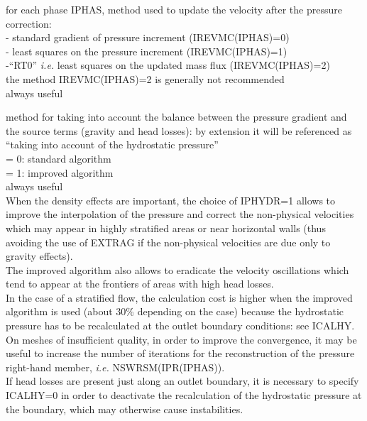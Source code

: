 {for each phase IPHAS, method used to update the velocity after the pressure
correction:\\
\hspace*{0,5cm}- standard gradient of pressure increment
(IREVMC(IPHAS)=0)\\
\hspace*{0,5cm}- least squares on the pressure increment
(IREVMC(IPHAS)=1)\\
\hspace*{0,5cm}-``RT0'' {\em i.e.} least squares on the updated mass flux
(IREVMC(IPHAS)=2)\\
the method IREVMC(IPHAS)=2 is generally not recommended\\
always useful}

{method for taking into account the balance between the pressure gradient and
the source terms (gravity and head losses): by extension it will be
referenced as ``taking into account of the hydrostatic pressure''\\
\hspace*{1.3cm}= 0: standard algorithm\\
\hspace*{1.3cm}= 1: improved algorithm\\
always useful\\
When the density effects are important, the choice of
IPHYDR=1 allows to improve the interpolation of the pressure and correct the
non-physical velocities which may appear in highly
stratified areas or near horizontal walls (thus
avoiding the use of EXTRAG if the non-physical velocities are due only to
gravity effects).\\
The improved algorithm also allows to eradicate the velocity oscillations
which tend to appear at the frontiers of areas with high head losses.\\
In the case of a stratified flow, the calculation cost is higher when the
improved algorithm is used (about 30\% depending on the case) because
the hydrostatic pressure has to be recalculated at the outlet boundary
conditions: see ICALHY.\\
On meshes of insufficient quality, in order to
improve the convergence, it may be useful to increase the number of
iterations for the reconstruction of the pressure right-hand member,
{\em i.e.} \mbox{NSWRSM(IPR(IPHAS))}.\\
If head losses are present just along an outlet boundary, it is necessary to
specify ICALHY=0 in order to deactivate the recalculation of the hydrostatic
pressure at the boundary, which may otherwise cause instabilities.}

